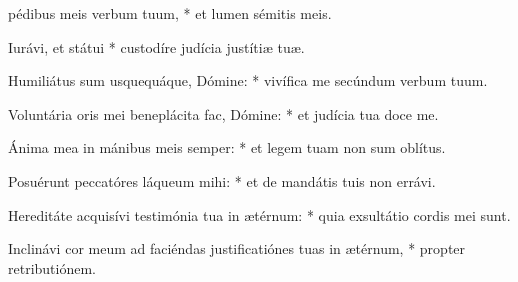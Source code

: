 \begin{psalmus}

 pédibus meis verbum tuum, * et lumen sémitis meis.

Iurávi, et státui * custodíre judícia justítiæ tuæ.

Humiliátus sum usquequáque, Dómine: * vivífica me secúndum verbum tuum.

Voluntária oris mei beneplácita fac, Dómine: * et judícia tua doce me.

Ánima mea in mánibus meis semper: * et legem tuam non sum oblítus.

Posuérunt peccatóres láqueum mihi: * et de mandátis tuis non errávi.

Hereditáte acquisívi testimónia tua in ætérnum: * quia exsultátio cordis mei sunt.

Inclinávi cor meum ad faciéndas justificatiónes tuas in ætérnum, * propter retributiónem.

\end{psalmus}
